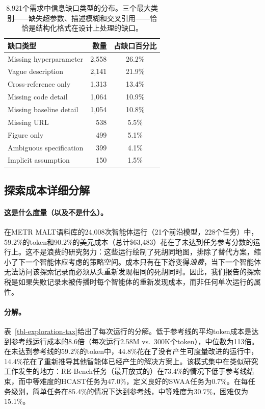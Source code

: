 \begin{table}[h]
\centering
\small
\begin{tabular}{lrc}
\toprule
\textbf{缺口类型} & \textbf{数量} & \textbf{占缺口百分比} \\
\midrule
Missing hyperparameter     & 2,558 & 26.2\% \\
Vague description          & 2,141 & 21.9\% \\
Cross-reference only       & 1,313 & 13.4\% \\
Missing code detail        & 1,064 & 10.9\% \\
Missing baseline detail    & 1,054 & 10.8\% \\
Missing URL                &   538 &  5.5\% \\
Figure only                &   499 &  5.1\% \\
Ambiguous specification    &   399 &  4.1\% \\
Implicit assumption        &   150 &  1.5\% \\
\bottomrule
\end{tabular}
\caption{8,921个需求中信息缺口类型的分布。三个最大类别——缺失超参数、描述模糊和交叉引用——恰恰是结构化格式在设计上处理的缺口。}
\label{tbl-gap-types}
\end{table}

\subsection{探索成本详细分解}
\label{sec-exploration-tax}

\paragraph{这是什么度量（以及不是什么）。}
在METR MALT语料库的24{,}008次智能体运行（21个前沿模型，228个任务）中，59.2\%的token和90.2\%的美元成本（总计\$63{,}483）花在了未达到任务参考分数的运行上。这不是浪费的研究努力：这些运行绘制了死胡同地图，排除了替代方案，缩小了下一个智能体应考虑的策略空间。成本只有在下游变得\emph{浪费}，当下一个智能体无法访问该探索记录而必须从头重新发现相同的死胡同时。因此，我们报告的探索税是如果失败记录未被传播时每个智能体的重新发现成本，而非任何单次运行的属性。

\paragraph{分解。}
表~\ref{tbl-exploration-tax}给出了每次运行的分解。低于参考线的平均token成本是达到参考线运行成本的8.6倍（每次运行2.58M vs.\ 300K个token），中位数为113倍。在未达到参考线的59.2\%的token中，44.8\%花在了没有产生可度量改进的运行中，14.4\%花在了重新推导其他智能体已经产生的解决方案上。该模式集中在类似研究工作发生的地方：RE-Bench任务（最开放式的）在73.4\%的情况下低于参考线结束，而中等难度的HCAST任务为47.0\%，定义良好的SWAA任务为0.7\%。在每任务级别，简单任务在85.4\%的情况下达到参考线，中等难度为30.7\%，困难仅为15.1\%。

